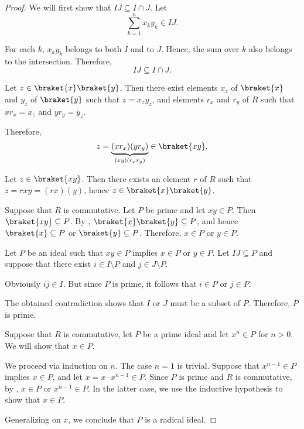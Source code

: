 \begin{proof}
   We will first show that \( IJ \subseteq I \cap J \). Let
  \begin{equation*}
    \sum_{k=1}^n x_k y_k \in IJ.
  \end{equation*}

  For each \( k \), \( x_k y_k \) belongs to both \( I \) and to \( J \). Hence, the sum over \( k \) also belongs to the intersection. Therefore,
  \begin{equation*}
    IJ \subseteq I \cap J.
  \end{equation*}

  \SufficiencySubProof* Let \( z \in \braket{x} \braket{y} \). Then there exist elements \( x_z \) of \( \braket{x} \) and \( y_z \) of \( \braket{y} \) such that \( z = x_z y_z \), and elements \( r_x \) and \( r_y \) of \( R \) such that \( x r_x = x_z \) and \( y r_y = y_z \).

  Therefore,
  \begin{equation*}
    z = \underbrace{(x r_x) (y r_y)}_{(xy) (r_x r_y)} \in \braket{xy}.
  \end{equation*}

  \NecessitySubProof* Let \( z \in \braket{xy} \). Then there exists an element \( r \) of \( R \) such that \( z = rxy = (rx)(y) \), hence \( z \in \braket{x} \braket{y} \).

   Suppose that \( R \) is commutative.
  \SufficiencySubProof* Let \( P \) be prime and let \( xy \in P \). Then \( \braket{xy} \subseteq P \). By , \( \braket{x} \braket{y} \subseteq P \), and hence \( \braket{x} \subseteq P \) or \( \braket{y} \subseteq P \). Therefore, \( x \in P \) or \( y \in P \).

  \NecessitySubProof* Let \( P \) be an ideal such that \( xy \in P \) implies \( x \in P \) or \( y \in P \). Let \( IJ \subseteq P \) and suppose that there exist \( i \in I \setminus P \) and \( j \in J \setminus P \).

  Obviously \( ij \in I \). But since \( P \) is prime, it follows that \( i \in P \) or \( j \in P \).

  The obtained contradiction shows that \( I \) or \( J \) must be a subset of \( P \). Therefore, \( P \) is prime.

   Suppose that \( R \) is commutative, let \( P \) be a prime ideal and let \( x^n \in P \) for \( n > 0 \). We will show that \( x \in P \).

  We proceed via induction on \( n \). The case \( n = 1 \) is trivial. Suppose that \( x^{n-1} \in P \) implies \( x \in P \), and let \( x = x \cdot x^{n-1} \in P \). Since \( P \) is prime and \( R \) is commutative, by , \( x \in P \) or \( x^{n-1} \in P \). In the latter case, we use the inductive hypothesis to show that \( x \in P \).

  Generalizing on \( x \), we conclude that \( P \) is a radical ideal.
\end{proof}


